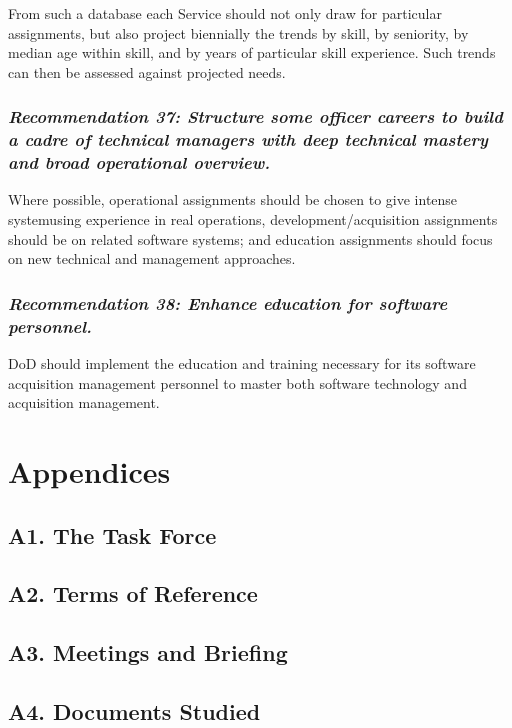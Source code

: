 \documentclass[12pt,final]{article}
\begin{document}
From such a database each Service should not only draw for particular
assignments, but also project biennially the trends by skill, by seniority, by
median age within skill, and by years of particular skill experience. Such
trends can then be assessed against projected needs.

\subsubsection*{\textit{Recommendation 37: Structure some officer careers to
build a cadre of technical managers with deep technical mastery and broad
operational overview.}}

Where possible, operational assignments should be chosen to give intense
systemusing experience in real operations, development/acquisition assignments
should be on related software systems; and education assignments should focus
on new technical and management approaches.

\subsubsection*{\textit{Recommendation 38: Enhance education for software
personnel.}}

DoD should implement the education and training necessary for its software
acquisition management personnel to master both software technology and
acquisition management.

\section{Appendices}

\subsection*{A1. The Task Force}

\subsection*{A2. Terms of Reference}

\subsection*{A3. Meetings and Briefing}

\subsection*{A4. Documents Studied}
\end{document}
